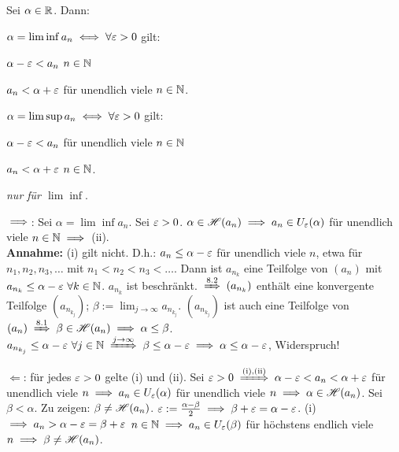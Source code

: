\documentclass[a4paper,twoside,DIV15,BCOR12mm]{scrbook}
\begin{document}
\begin{satz}
Sei $\alpha \in \mathbb{R}$. Dann:

$ \alpha = \lim\inf a_n \iff \forall \varepsilon>0$ gilt:

\begin{liste}
\item $\alpha - \varepsilon < a_n$ \ffa $n\in\mathbb{N}$
\item $a_n<\alpha+\varepsilon$ für unendlich viele $n\in\mathbb{N}$.
\end{liste}

$ \alpha = \lim\sup a_n \iff \forall \varepsilon>0$ gilt:
\begin{liste}
\item $\alpha - \varepsilon < a_n$ für unendlich viele $n\in\mathbb{N}$
\item $a_n<\alpha+\varepsilon$ \ffa $n\in\mathbb{N}$.
\end{liste}
\end{satz}

\begin{beweis}
\textit{nur für $\lim\inf$}.

\glqq$\implies$\grqq: Sei $\alpha = \lim\inf a_n$. Sei $\varepsilon > 0 $. $\alpha\in\mathscr{H}(a_n) \implies a_n \in U_\varepsilon(\alpha)$ für unendlich viele $n\in\mathbb{N} \implies$ (ii). \\
\textbf{Annahme:} (i) gilt nicht. D.h.: $a_n \le \alpha - \varepsilon$ für unendlich viele $n$, etwa für $n_1, n_2, n_3,\ldots$ mit $n_1 < n_2 < n_3 <\ldots$. Dann ist $a_{n_k}$ eine Teilfolge von $(a_n)$ mit $a_{n_k} \le \alpha-\varepsilon \ \forall k \in\mathbb{N}$. $a_{n_k}$ ist beschränkt. $\folgtwegen{8.2} (a_{n_k})$ enthält eine konvergente Teilfolge $(a_{n_{k_j}})$; $\displaystyle\beta := \lim_{j\to\infty} a_{n_{k_j}}$. $(a_{n_{k_j}})$ ist auch eine Teilfolge von $(a_n) \folgtwegen{8.1} \beta \in\H(a_n) \folgt \alpha \le \beta$. $a_{n_{k_j}} \le \alpha -\ep \ \forall j \in\MdN \folgtwegen{j\to\infty} \beta \le \alpha-\ep \folgt \alpha \le \alpha - \ep$, Widerspruch!

\glqq$\Leftarrow$\grqq: für jedes $\varepsilon>0$ gelte (i) und (ii). Sei $\ep>0\folgtnach{(i),(ii)} \alpha -\ep < a_n < \alpha+\ep$ für unendlich viele $n \implies a_n\in U_\varepsilon(\alpha)$ für unendlich viele $n \implies \alpha \in \mathscr{H}(a_n)$. Sei $\beta < \alpha$. Zu zeigen: $\beta \ne \mathscr{H}(a_n)$.  $\varepsilon := \frac{\alpha -\beta}{2} \implies \beta + \varepsilon = \alpha - \varepsilon$. (i) $\implies a_n > \alpha - \varepsilon = \beta + \varepsilon$ \ffa $n\in\mathbb{N} \implies a_n\in U_\varepsilon(\beta)$ für höchstens endlich viele $n \implies \beta \ne \mathscr{H}(a_n)$.
\end{beweis}
\end{document}
